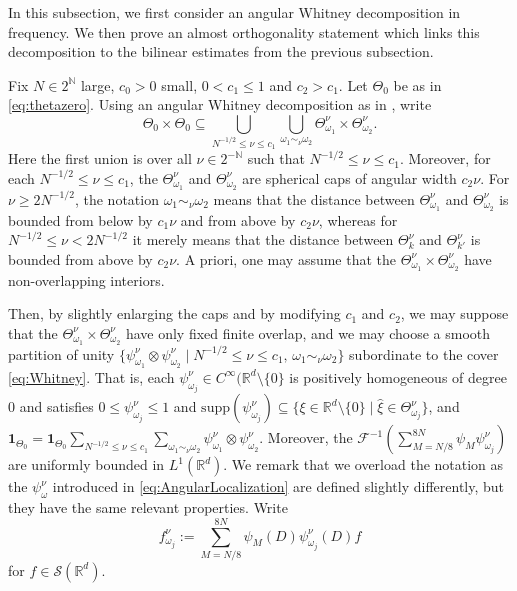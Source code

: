\documentclass{amsart}
\numberwithin{equation}{section}
\theoremstyle{definition}
\newcommand{\Rd}{\mathbb{R}^{d}}
\newcommand{\Rn}{\mathbb{R}^{d}}
\newcommand{\N}{\mathbb{N}}
\newcommand{\F}{\mathcal{F}}
\newcommand {\ind}{{\mathbf{1}}}
\newcommand {\Sw}{\mathcal{S}}
\newcommand {\supp}{\mathrm{supp}}
\newcommand {\w}{\omega}
\begin{document}
In this subsection, we first consider an angular Whitney decomposition in frequency. We then prove an almost orthogonality statement which links this decomposition to the bilinear estimates from the previous subsection. 

Fix %
$N\in 2^{\N}$ large, $c_{0}>0$ small, $0<c_{1}\leq 1$ and $c_{2}>c_{1}$. 
Let $\Theta_{0}$ be as in \eqref{eq:thetazero}. 
Using an angular Whitney decomposition as in \cite{TaoVargas2000}, %
write 
\begin{equation}\label{eq:Whitney}
\Theta_{0}\times\Theta_{0}\subseteq \bigcup_{N^{-1/2}\leq \nu\leq c_{1}}\bigcup_{\w_{1}\sim_{\nu} \w_{2}}\Theta^{\nu}_{\w_{1}}\times \Theta^{\nu}_{\w_{2}}.
\end{equation}
Here the first union is over all $\nu\in 2^{-\N}$ such that $N^{-1/2}\leq \nu\leq c_{1}$. %
Moreover, for each $N^{-1/2}\leq \nu\leq c_{1}$, the $\Theta_{\w_{1}}^{\nu}$ and $\Theta_{\w_{2}}^{\nu}$ are spherical caps of angular width $c_{2}\nu$. %
For $\nu\geq 2N^{-1/2}$, the notation $\w_{1}\sim_{\nu}\w_{2}$ means that the distance between $\Theta_{\w_{1}}^{\nu}$ and $\Theta_{\w_{2}}^{\nu}$ is bounded from below by $c_{1}\nu$ and from above by $c_{2}\nu$, %
whereas for $N^{-1/2}\leq \nu<2N^{-1/2}$ %
it merely means that the distance between $\Theta_{k}^{\nu}$ and $\Theta_{k'}^{\nu}$ is bounded from above by $c_{2}\nu$. 
A priori, one may assume that the $\Theta_{\w_{1}}^{\nu}\times \Theta_{\w_{2}}^{\nu}$ have non-overlapping interiors.

Then, by slightly enlarging the caps and by modifying $c_{1}$ and $c_{2}$, we may suppose that the $\Theta_{\w_{1}}^{\nu}\times \Theta_{\w_{2}}^{\nu}$ have only fixed finite overlap, and we may choose a smooth partition of unity $\{\psi^{\nu}_{\w_{1}}\otimes \psi^{\nu}_{\w_{2}}\mid N^{-1/2}\leq \nu\leq c_{1}, \, \w_{1}\sim_{\nu}\w_{2}\}$ subordinate to the cover \eqref{eq:Whitney}. That is, each $\psi^{\nu}_{\w_{j}}\in C^{\infty}(\Rn\setminus \{0\}$ is positively homogeneous of degree $0$ and satisfies $0\leq \psi^{\nu}_{\w_{j}}\leq 1$ and $\supp(\psi^{\nu}_{\w_{j}})\subseteq \{\xi\in\Rd\setminus\{0\}\mid \hat{\xi}\in \Theta_{\w_{j}}^{\nu}\}$, and $\ind_{\Theta_{0}}=\ind_{\Theta_{0}}\sum_{N^{-1/2}\leq \nu\leq c_{1}}\sum_{\w_{1}\sim_{\nu} \w_{2}}\psi^{\nu}_{\w_{1}}\otimes \psi^{\nu}_{\w_{2}}$. Moreover, the $\F^{-1}(\sum_{M=N/8}^{8N}\psi_{M}\psi_{\w_{j}}^{\nu})$ are uniformly bounded in $L^{1}(\Rd)$.  We remark that we overload the notation as the $\psi_{\omega}^{\nu}$ introduced in \eqref{eq:AngularLocalization} are defined slightly differently, but they have the same relevant properties. Write 
\[
f^{\nu}_{\w_{j}}:=\sum_{M=N/8}^{8N}\psi_{M}(D)\psi^{\nu}_{\w_{j}}(D)f
\]
for $f\in\Sw(\Rd)$.
\end{document}
